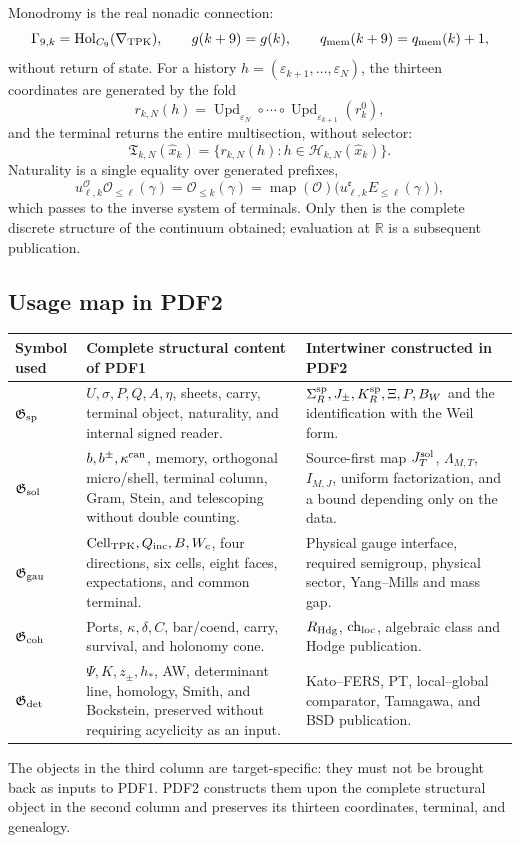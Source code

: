 Monodromy is the real nonadic connection:
\[
 \Gamma_{9,k}=\operatorname{Hol}_{C_9}(\nabla_{\rm TPK}),
 \qquad g(k+9)=g(k),
 \qquad q_{\rm mem}(k+9)=q_{\rm mem}(k)+1,
\]
without return of state. For a history
\(h=(\varepsilon_{k+1},\ldots,\varepsilon_N)\), the thirteen coordinates are
generated by the fold
\[
 r_{k,N}(h)=
 \operatorname{Upd}_{\varepsilon_N}\circ\cdots\circ
 \operatorname{Upd}_{\varepsilon_{k+1}}(r^0_{k}),
\]
and the terminal returns the entire multisection, without selector:
\[
 \mathfrak T_{k,N}(\widehat x_k)
 =\{r_{k,N}(h):h\in\mathscr H_{k,N}(\widehat x_k)\}.
\]
Naturality is a single equality over generated prefixes,
\[
 u_{\ell,k}^{\mathcal O}\mathcal O_{\le\ell}(\gamma)
 =\mathcal O_{\le k}(\gamma)
 =\operatorname{map}(\mathcal O)
   \bigl(u_{\ell,k}^{\mathfrak e}E_{\le\ell}(\gamma)\bigr),
\]
which passes to the inverse system of terminals. Only then is the
complete discrete structure of the continuum obtained; evaluation at \(\mathbb R\) is
a subsequent publication.

\subsection*{Usage map in PDF2}

\begin{center}
\small
\begin{tabularx}{\textwidth}{@{}p{}X p{}@{}}
\toprule
Symbol used & Complete structural content of PDF1 &
Intertwiner constructed in PDF2 \\
\midrule
\(\mathfrak G_{\rm sp}\) &
\(U,\sigma,P,Q,A,\eta\), sheets, carry, terminal object, naturality, and internal
signed reader. &
\(\Sigma_R^{\rm sp},J_\pm,K_R^{\rm sp},\Xi,P,B_W\) and the identification
with the Weil form. \\
\(\mathfrak G_{\rm sol}\) &
\(b,b^\pm,\kappa^{\rm can}\), memory, orthogonal micro/shell, terminal column, Gram, Stein,
and telescoping without double counting. &
Source-first map \(J_T^{\rm sol}\), \(\Lambda_{M,T}\), \(I_{M,J}\), uniform factorization, and a bound depending only on the data. \\
\(\mathfrak G_{\rm gau}\) &
\(\operatorname{Cell}_{\rm TPK},Q_{\rm inc},B,W_c\), four directions,
six cells, eight faces, expectations, and common terminal. &
Physical gauge interface, required semigroup, physical sector, Yang--Mills and mass gap. \\
\(\mathfrak G_{\rm coh}\) &
Ports, \(\kappa,\delta,C\), bar/coend, carry, survival, and holonomy
cone. &
\(R_{\rm Hdg}\), \(\mathrm{ch}_{\rm loc}\), algebraic class and Hodge
publication. \\
\(\mathfrak G_{\rm det}\) &
\(\Psi,K,z_\pm,h_*\), AW, determinant line, homology, Smith, and
Bockstein, preserved without requiring acyclicity as an input. &
Kato--FERS, PT, local--\newline global comparator, Tamagawa, and BSD publication. \\
\bottomrule
\end{tabularx}
\end{center}

The objects in the third column are target-specific: they must not be brought back as inputs to PDF1. PDF2 constructs them upon the complete structural object in the second column and preserves its thirteen coordinates, terminal, and genealogy.

